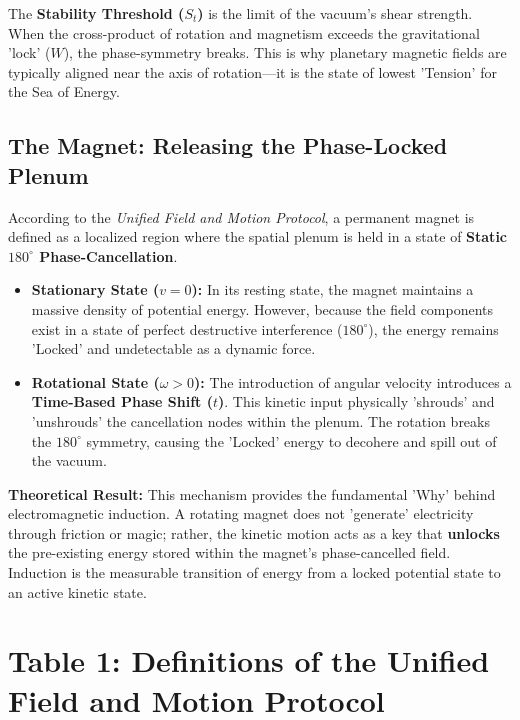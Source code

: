 \documentclass[11pt]{article}
\begin{document}
The \textbf{Stability Threshold ($S_t$)} is the limit of the vacuum's shear strength. When the cross-product of rotation and magnetism exceeds the gravitational 'lock' ($W$), the phase-symmetry breaks. This is why planetary magnetic fields are typically aligned near the axis of rotation—it is the state of lowest 'Tension' for the Sea of Energy.

\subsection*{The Magnet: Releasing the Phase-Locked Plenum}

According to the \textit{Unified Field and Motion Protocol}, a permanent magnet is defined as a localized region where the spatial plenum is held in a state of \textbf{Static $180^\circ$ Phase-Cancellation}.

\begin{itemize}
    \item \textbf{Stationary State ($v = 0$):} In its resting state, the magnet maintains a massive density of potential energy. However, because the field components exist in a state of perfect destructive interference ($180^\circ$), the energy remains 'Locked' and undetectable as a dynamic force.
    
    \item \textbf{Rotational State ($\omega > 0$):} The introduction of angular velocity introduces a \textbf{Time-Based Phase Shift ($t$)}. This kinetic input physically 'shrouds' and 'unshrouds' the cancellation nodes within the plenum. The rotation breaks the $180^\circ$ symmetry, causing the 'Locked' energy to decohere and spill out of the vacuum.
\end{itemize}



\textbf{Theoretical Result:} This mechanism provides the fundamental 'Why' behind electromagnetic induction. A rotating magnet does not 'generate' electricity through friction or magic; rather, the kinetic motion acts as a key that \textbf{unlocks} the pre-existing energy stored within the magnet’s phase-cancelled field. Induction is the measurable transition of energy from a locked potential state to an active kinetic state.

\section*{Table 1: Definitions of the Unified Field and Motion Protocol}
\end{document}
